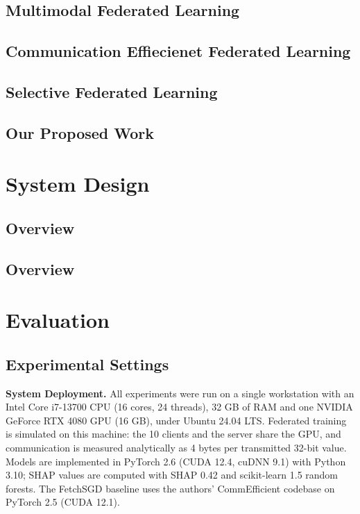 \documentclass[sigconf]{acmart}
\begin{document}
\subsection{Multimodal Federated Learning}

\subsection{Communication Effiecienet Federated Learning}

\subsection{Selective Federated Learning}

\subsection{Our Proposed Work}



\section{System Design}

\subsection{Overview}

\subsection{Overview}



\section{Evaluation}

\subsection{Experimental Settings}

{\bfseries System Deployment.}
 All experiments were run on a single workstation with an Intel Core i7-13700 CPU (16 cores, 24 threads), 32 GB of RAM and one NVIDIA GeForce RTX 4080 GPU (16 GB), under Ubuntu 24.04 LTS. Federated training is simulated on this machine: the 10 clients and the server share the GPU, and communication is measured analytically as 4 bytes per transmitted 32-bit value. Models are implemented in PyTorch 2.6 (CUDA 12.4, cuDNN 9.1) with Python 3.10; SHAP values are computed with SHAP 0.42 and scikit-learn 1.5 random forests. The FetchSGD baseline uses the authors' CommEfficient codebase on PyTorch 2.5 (CUDA 12.1).
\end{document}
